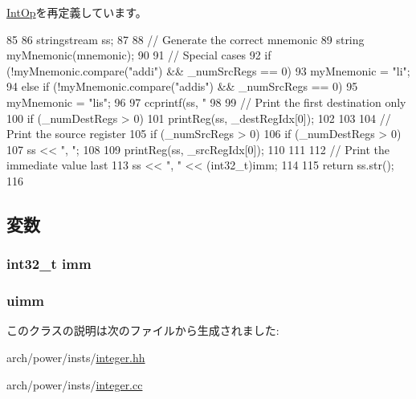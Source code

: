 \hyperlink{classPowerISA_1_1IntOp_a3134956ec18bb095818e06eb988f6c55}{IntOp}を再定義しています。


\begin{DoxyCode}
85 {
86     stringstream ss;
87 
88     // Generate the correct mnemonic
89     string myMnemonic(mnemonic);
90 
91     // Special cases
92     if (!myMnemonic.compare("addi") && _numSrcRegs == 0) {
93         myMnemonic = "li";
94     } else if (!myMnemonic.compare("addis") && _numSrcRegs == 0) {
95         myMnemonic = "lis";
96     }
97     ccprintf(ss, "%
98 
99     // Print the first destination only
100     if (_numDestRegs > 0) {
101         printReg(ss, _destRegIdx[0]);
102     }
103 
104     // Print the source register
105     if (_numSrcRegs > 0) {
106         if (_numDestRegs > 0) {
107             ss << ", ";
108         }
109         printReg(ss, _srcRegIdx[0]);
110     }
111 
112     // Print the immediate value last
113     ss << ", " << (int32_t)imm;
114 
115     return ss.str();
116 }
\end{DoxyCode}


\subsection{変数}
\hypertarget{classPowerISA_1_1IntImmOp_a71f011dbd3228d41f9e08aaf8c133f77}{
\subsubsection[{imm}]{\setlength{\rightskip}{0pt plus 5cm}int32\_\-t {\bf imm}}}
\label{classPowerISA_1_1IntImmOp_a71f011dbd3228d41f9e08aaf8c133f77}
\hypertarget{classPowerISA_1_1IntImmOp_a3d3bf1a8a03d0ccb5d3bd879613af6d3}{
\subsubsection[{uimm}]{ {\bf uimm}}}
\label{classPowerISA_1_1IntImmOp_a3d3bf1a8a03d0ccb5d3bd879613af6d3}


このクラスの説明は次のファイルから生成されました:\begin{DoxyCompactItemize}
\item 
arch/power/insts/\hyperlink{integer_8hh}{integer.hh}\item 
arch/power/insts/\hyperlink{integer_8cc}{integer.cc}\end{DoxyCompactItemize}
